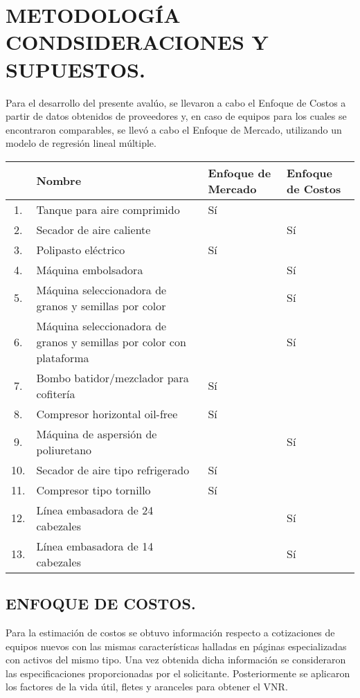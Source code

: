 
\chapter{METODOLOGÍA CONDSIDERACIONES Y SUPUESTOS.} %

Para el desarrollo del presente avalúo, se llevaron a cabo el Enfoque de Costos
a partir de datos obtenidos de proveedores y, en caso de equipos para los cuales
se encontraron comparables, se llevó a cabo el Enfoque de Mercado, utilizando un
modelo de regresión lineal múltiple.

\begin{tabular}{|cp{7cm}|m{2cm}|m{2cm}|}
	\hline 
  	& Nombre & Enfoque de Mercado & Enfoque de Costos \\ \hline 
	1. & Tanque para aire comprimido & Sí & \\ \hline
	2. & Secador de aire caliente & & Sí \\ \hline
	3. & Polipasto eléctrico & Sí & \\ \hline
	4. & Máquina embolsadora & & Sí \\ \hline
	5. & Máquina seleccionadora de granos y semillas por color & & Sí \\ \hline
	6. & Máquina seleccionadora de granos y semillas por color con plataforma & & Sí \\ \hline
	7. & Bombo batidor/mezclador para cofitería & Sí & \\ \hline
	8. & Compresor horizontal oil-free & Sí & \\ \hline
	9. & Máquina de aspersión de poliuretano & & Sí \\ \hline
	10. & Secador de aire tipo refrigerado & Sí & \\ \hline
	11. & Compresor tipo tornillo & Sí & \\ \hline
	12. & Línea embasadora de 24 cabezales & & Sí \\ \hline
	13. & Línea embasadora de 14 cabezales & & Sí \\ \hline
\end{tabular}

\section{ENFOQUE DE COSTOS.} %
Para la estimación de costos se  obtuvo información  respecto a cotizaciones de equipos nuevos con las mismas características halladas en páginas especializadas con activos del mismo tipo. Una vez obtenida  dicha información se consideraron las especificaciones proporcionadas por el solicitante.
Posteriormente se aplicaron los factores de la vida útil, fletes y aranceles para obtener el VNR.

